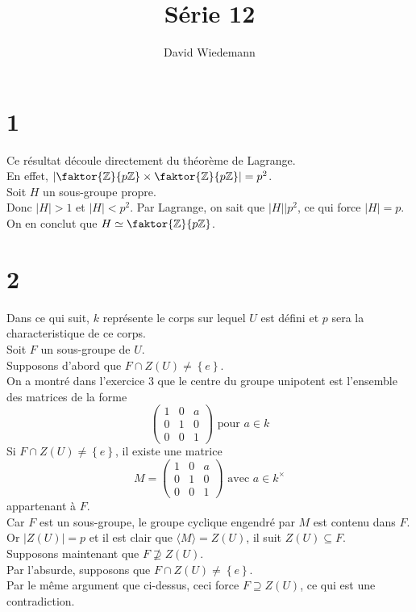 \documentclass[11pt, a4paper]{article}
\newcommand{\zpz}{\faktor{\mathbb{Z}}{p \mathbb{Z}}}
\begin{document}
\title{Série 12}
\author{David Wiedemann}
\maketitle
\section*{1}
Ce résultat découle directement du théorème de Lagrange.\\
En effet, $| \faktor { \mathbb{Z}} { p \mathbb{Z}} \times \zpz | = p^{2}$.\\
Soit $H$ un sous-groupe propre.\\
Donc $|H|>1$ et $|H|< p^{2}$.
Par Lagrange, on sait que $|H| \big\vert p^{2}$, ce qui force $|H|=p$.\\
On en conclut que $H \simeq \zpz$.\\
\section*{2}
Dans ce qui suit, $k$ représente le corps sur lequel $U$ est défini et $p$ sera la characteristique de ce corps.\\
Soit $F$ un sous-groupe de $U$.\\
Supposons d'abord que $F \cap Z( U) \neq \left\{ e  \right\} $.\\
On a montré dans l'exercice 3 que le centre du groupe unipotent est l'ensemble des matrices de la forme
\[ 
\begin{pmatrix}
	1 & 0 & a\\
	0 & 1 & 0\\
	0 & 0 & 1
\end{pmatrix}
\text{ pour } a \in k
\]
Si $F \cap Z( U) \neq \left\{ e  \right\} $, il existe une matrice 
\[ 
	M=
\begin{pmatrix}
	1 & 0 & a\\
	0 & 1 & 0\\
	0 & 0 & 1
\end{pmatrix}
\text{ avec } a \in k^{\times}	
\]
appartenant à $F$.\\
Car  $F$ est un sous-groupe, le groupe cyclique engendré par $M$ est contenu dans $F$.\\
Or $|Z( U) | = p$ et il est clair que $\langle M \rangle = Z( U) $, il suit $Z( U) \subseteq F$.\\
Supposons maintenant que $F \not \supseteq Z( U) $.\\
Par l'absurde, supposons que $F \cap Z( U) \neq \left\{ e  \right\} $.\\
Par le même argument que ci-dessus, ceci force $F \supseteq Z( U) $, ce qui est une contradiction.\\
\end{document}
